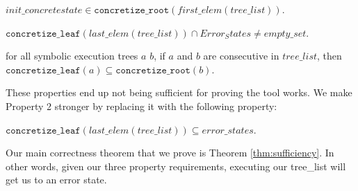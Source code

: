 \setcounter{property}{0}
\renewcommand{\theproperty}{Z.\arabic{property}}
\begin{property}
  \label{prop:startinit}
$init\_concrete state \in \mathtt{concretize\_root}(first\_elem (tree\_list))$.
\end{property}

\begin{property}
  \label{prop:enderror}
$ \mathtt{concretize\_leaf} (last\_elem (tree\_list)) \cap Error_States 
\neq empty\_set $.
\end{property}

\begin{property}
  \label{prop:stitch}
for all symbolic execution trees $a$ $b$, 
if $a$ and $b$ are consecutive in $tree\_list$, then 
$\mathtt{concretize\_leaf} (a) \subseteq
\mathtt{concretize\_root}(b) $.
\end{property}

These properties end up not being sufficient for proving the tool works. 
We make Property 2 stronger by replacing it with the following property:

\setcounter{property}{1}
\renewcommand{\theproperty}{Z.\arabic{property}'}
\begin{property}
  \label{prop:correctedz2}
$\mathtt{concretize\_leaf} (last\_elem (tree\_list))
\subseteq error\_states $.
\end{property}



Our main correctness theorem that we prove is Theorem \ref{thm:sufficiency}. In other words, given our three property requirements, executing our tree\_list will get us to an error state.

